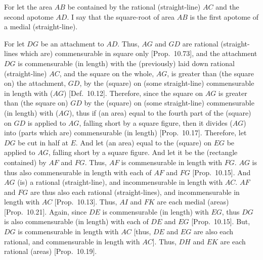 \begin{Parallel}{}{}
{For let the area $AB$ be contained by the rational (straight-line) $AC$ and the second apotome $AD$. I say that the square-root of area $AB$ is the first apotome of a medial (straight-line).

For let $DG$ be an attachment to $AD$. Thus, $AG$ and $GD$
are rational (straight-lines which are) commensurable in square only [Prop.~10.73],
and the attachment $DG$ is commensurable (in length) with the
(previously) laid down rational (straight-line) $AC$, and the square on
the whole, $AG$, is greater than (the square on) the attachment, $GD$,
by the (square) on (some straight-line) commensurable in length with ($AG$) 
[Def.~10.12]. Therefore, since the square on $AG$ is
greater than (the square on) $GD$ by the (square) on (some
straight-line) commensurable (in length) with ($AG$), thus if  (an area)
equal to the fourth part of the (square) on $GD$ is applied
to $AG$, falling short by a square figure, then it divides ($AG$) into (parts which
are) commensurable (in length) [Prop.~10.17]. 
Therefore, let $DG$ be cut in half at $E$. And let (an area) equal to
the (square) on $EG$ be applied to $AG$, falling short
by a square figure. And let it be the (rectangle contained) by $AF$ and $FG$.
Thus, $AF$ is commensurable in length with $FG$. $AG$ is thus
also commensurable in length with each of $AF$ and $FG$ [Prop.~10.15]. And $AG$ (is) a rational (straight-line), and incommensurable in length with $AC$. $AF$ and $FG$
are thus also each rational (straight-lines), and incommensurable in length with
$AC$ [Prop.~10.13].
Thus, $AI$
and $FK$ are each medial (areas) [Prop.~10.21]. 
Again, since $DE$ is commensurable (in length) with $EG$, thus
$DG$ is also commensurable (in length) with each of $DE$ and $EG$ [Prop.~10.15]. But, $DG$ is commensurable
in length with $AC$ [thus, $DE$ and $EG$ are also each rational, and
commensurable in length with $AC$]. Thus, $DH$ and $EK$ are each
rational (areas) [Prop.~10.19].

}
\end{Parallel}
